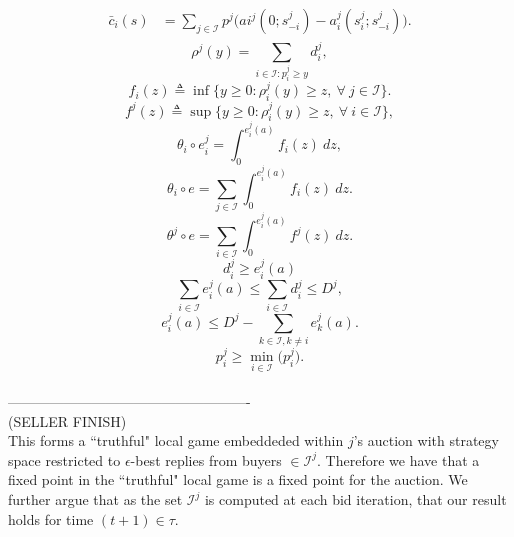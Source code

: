 \documentclass[12pt]{article}
\theoremstyle{definition}
\newcommand{\mcI}{\mathcal{I}}
\begin{document}
\begin{multicols}{2}
\begin{align}
\begin{split}
    \bar{c}_i(s) &= \displaystyle\sum_{j\in\mcI} 
p^j \bigg(ai^j(0; s_{-i}^j)
    -a_i^j(s_i^j;s_{-i}^j)\bigg).
\end{split}
\end{align}
\begin{equation}\label{datademand}
    \rho^j(y) = \sum_{i\in\mcI : p_i^j\ge y} d_i^j, 
\end{equation}
\begin{equation}\label{buyerinversedemand}
    f_i(z) \triangleq \inf\big\lbrace y\ge 0:
        \rho_i^j(y) \ge z, \ \forall \ j \in \mcI\big\rbrace.
\end{equation}
\begin{equation}\label{sellerinversedemand}
    f^j(z) \triangleq \sup\big\lbrace y\ge 0:
        \rho_i^j(y) \ge z, \ \forall \ i \in \mcI\big\rbrace,
\end{equation}
\begin{equation}\label{singlevaluation}
    \theta_i \circ e_i^j = \int_0^{e_i^j(a)} f_i(z) \ dz,
\end{equation}
\begin{equation}\label{buyervaluation}
    \theta_i \circ e = \displaystyle\sum_{j\in\mcI}
 \int_0^{e_i^j(a)} f_i(z) \ dz.
\end{equation}
\begin{equation}\label{sellervaluation}
    \theta^j \circ e = \displaystyle\sum_{i\in\mcI}
 \int_0^{e_i^j(a)} f^j(z) \ dz.
\end{equation}
\begin{equation}\label{quantity}
    d_i^j \ge e_i^j(a)
\end{equation}
\begin{equation}\label{budget}
    \displaystyle\sum_{i\in\mcI} e_i^j(a) \le \sum_{i\in\mcI} d^j_i \le D^j,
\end{equation}
\begin{equation}\label{partialallocation}
    e_i^j(a) \le D^j - \sum_{k\in\mcI, k\ne i} e_k^j(a).
\end{equation}
\begin{equation}\label{reserveprice}
   p_i^j \ge \min_{i\in\mcI}\big(p_i^j).
\end{equation}
\\----------------------------------------------------\\
(SELLER FINISH)\\
This forms a ``truthful" local game embeddeded within $j$'s auction with strategy space
restricted to $\epsilon$-best replies from buyers $\in \mcI^j$. Therefore we have that a
fixed point in the ``truthful" local game is a fixed point for the auction. We
further argue that as the set $\mcI^j$ is
computed at each bid iteration, that our result holds for time $(t+1) \in \tau$.



\end{multicols}
\end{document}
